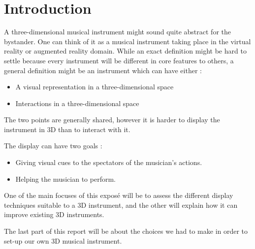 \chapter{Introduction}
A three-dimensional musical instrument might sound quite abstract for the bystander. One can think of it as a musical instrument taking place in the virtual reality or augmented reality domain. While an exact definition might be hard to settle because every instrument will be different in core features to others, a general definition might be an instrument which can have either :
\begin{itemize}
\item A visual representation in a three-dimensional space
\item Interactions in a three-dimensional space
\end{itemize}

The two points are generally shared, however it is harder to display the instrument in 3D than to interact with it.

The display can have two goals :  \cite{berthaut2010piivert}
\begin{itemize}
\item Giving visual cues to the spectators of the musician's actions.
\item Helping the musician to perform.
\end{itemize}

One of the main focuses of this exposé will be to assess the different display techniques suitable to a 3D instrument, and the other will explain how it can improve existing 3D instruments.

The last part of this report will be about the choices we had to make in order to set-up our own 3D musical instrument.